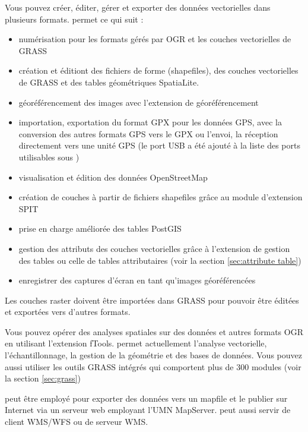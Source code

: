 
Vous pouvez créer, éditer, gérer et exporter des données vectorielles dans plusieurs formats. \qg permet ce qui suit :

\begin{itemize}[label=--]
\item numérisation pour les formats gérés par OGR et les couches vectorielles de GRASS
\item création et éditiont des fichiers de forme (shapefiles), des couches vectorielles de GRASS et des tables géométriques SpatiaLite.
\item géoréférencement des images avec l'extension de géoréférencement
\item importation, exportation du format GPX pour les données GPS, avec la conversion des autres formats GPS vers le GPX ou l'envoi, la réception directement vers une unité GPS (le port USB a été ajouté à la liste des ports utilisables sous \nix{})
\item visualisation et édition des données OpenStreetMap
\item création de couches \pg à partir de fichiers shapefiles grâce au module d'extension SPIT
\item prise en charge améliorée des tables PostGIS
\item gestion des attributs des couches vectorielles grâce à l'extension de gestion des tables ou celle de tables attributaires (voir la section \ref{sec:attribute table})
\item enregistrer des captures d'écran en tant qu'images géoréférencées
\end{itemize}

Les couches raster doivent être importées dans GRASS pour pouvoir être éditées et exportées vers d'autres formats.


Vous pouvez opérer des analyses spatiales sur des données \ppg et autres formats OGR en utilisant l'extension fTools. \qg permet actuellement l'analyse vectorielle, l'échantillonnage, la gestion de la géométrie et des bases de données. Vous pouvez aussi utiliser les outils GRASS intégrés qui comportent plus de 300 modules (voir la section \ref{sec:grass})


\qg peut être employé pour exporter des données vers un mapfile et le publier sur Internet via un serveur web employant l'UMN MapServer. \qg peut aussi servir de client WMS/WFS ou de serveur WMS.

